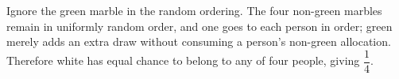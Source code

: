 Ignore the green marble in the random ordering. The four non-green marbles remain in uniformly random order, and one goes to each person in order; green merely adds an extra draw without consuming a person's non-green allocation. Therefore white has equal chance to belong to any of four people, giving $\boxed{\dfrac{1}{4}}$.
